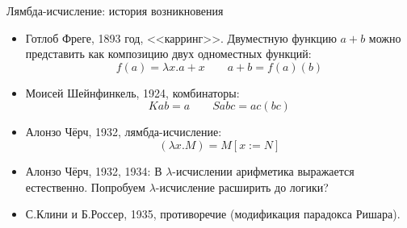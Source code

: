 \documentclass[aspectratio=169]{beamer}
\begin{document}
\begin{frame}{Лямбда-исчисление: история возникновения}
\begin{itemize}
\item Готлоб Фреге, 1893 год, <<карринг>>. Двуместную функцию $a + b$ 
можно представить как композицию двух одноместных функций: $$f(a) = \lambda x. a + x\quad\quad a + b = f(a)(b)$$
\item Моисей Шейнфинкель, 1924, комбинаторы: $$Kab = a\quad\quad Sabc = ac(bc)$$
\item Алонзо Чёрч, 1932, лямбда-исчисление: $$(\lambda x.M) = M[x := N]$$
\item Алонзо Чёрч, 1932, 1934:
В $\lambda$-исчислении арифметика выражается естественно. Попробуем $\lambda$-исчисление
расширить до логики?
\item С.Клини и Б.Россер, 1935, противоречие (модификация парадокса Ришара).
\end{itemize}
\end{frame}

\end{document}
